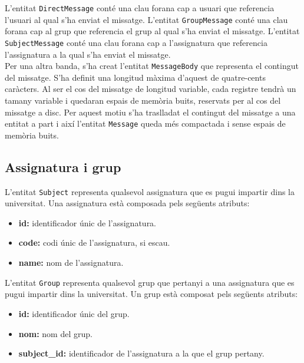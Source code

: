    	L'entitat \texttt{DirectMessage} conté una clau forana cap a usuari que referencia l'usuari al qual s'ha enviat el missatge.	L'entitat \texttt{GroupMessage} conté una clau forana cap al grup que referencia el grup al qual s'ha enviat el missatge.	L'entitat \texttt{SubjectMessage} conté una clau forana cap a l'assignatura que referencia l'assignatura a la qual s'ha enviat el missatge.\\
   
   	Per una altra banda, s'ha creat l'entitat \texttt{MessageBody} que representa el contingut del missatge. S'ha definit una longitud màxima d'aquest de quatre-cents caràcters. Al ser el cos del missatge de longitud variable, cada registre tendrà un tamany variable i quedaran espais de memòria buits, reservats per al cos del missatge a disc. Per aquest motiu s'ha traslladat el contingut del missatge a una entitat a part i així l'entitat \texttt{Message} queda més compactada i sense espais de memòria buits.\\
   	
   	\subsection{Assignatura i grup}
   	
   	L'entitat \texttt{Subject} representa qualsevol assignatura que es pugui impartir dins la universitat. Una assignatura està composada pels següents atributs:
   	
   	\begin{itemize}
   		\item \textbf{id:} identificador únic de l'assignatura.
   		\item \textbf{code:} codi únic de l'assignatura, si escau.
   		\item \textbf{name:} nom de l'assignatura.
   	\end{itemize}
   	
   	L'entitat \texttt{Group} representa qualsevol grup que pertanyi a una assignatura que es pugui impartir dins la universitat. Un grup està composat pels següents atributs:
   	
   	\begin{itemize}
   		\item \textbf{id:} identificador únic del grup.
   		\item \textbf{nom:} nom del grup.
   		\item \textbf{subject\_id:} identificador de l'assignatura a la que el grup pertany. 
   	\end{itemize}
   	
